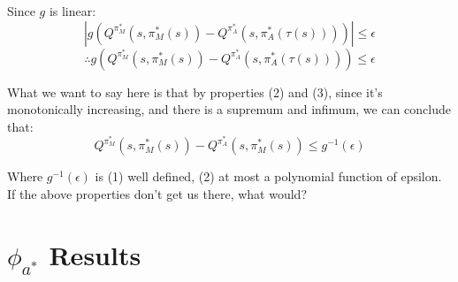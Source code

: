\documentclass[11pt]{amsart}
\begin{document}
Since $g$ is linear:
\begin{equation}
|g\left(Q^{\pi_M^*}\left(s,\pi_M^*(s)\right) - Q^{\pi_A^*}\left(s, \pi_A^*(\tau(s))\right)\right) | \leq \epsilon
\end{equation}
\begin{equation}
\therefore g\left(Q^{\pi_M^*}\left(s,\pi_M^*(s)\right) - Q^{\pi_A^*}\left(s, \pi_A^*(\tau(s))\right)\right) \leq \epsilon
\end{equation}

What we want to say here is that by properties (2) and (3), since it's monotonically increasing, and there is a supremum and infimum, we can conclude that:
\begin{equation}
Q^{\pi_M^*}\left(s,\pi_M^*(s)\right) - Q^{\pi_A^*}\left(s,\pi_M^*(s)\right) \leq g^{-1}(\epsilon)
\end{equation}

Where $g^{-1}(\epsilon)$ is (1) well defined, (2) at most a polynomial function of epsilon. If the above properties don't get us there, what would?

\newpage
\section{$\phi_{a^*}$ Results}




\newpage

\end{document}

